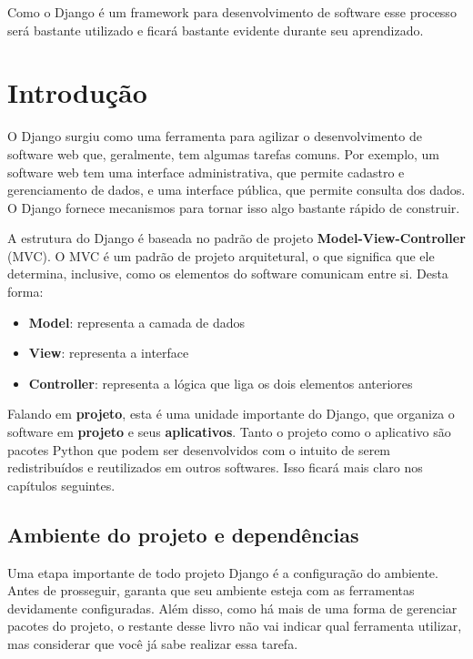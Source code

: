 \documentclass[brazil,a4paper,oneside,openright,parskip=full]{book}
\providecommand{\tightlist}{%
  \setlength{\itemsep}{0pt}\setlength{\parskip}{0pt}}
\begin{document}
Como o Django é um framework para desenvolvimento de software esse
processo será bastante utilizado e ficará bastante evidente durante seu
aprendizado.

\mainmatter

\hypertarget{sec:introducao}{%
\chapter{Introdução}\label{sec:introducao}}

O Django surgiu como uma ferramenta para agilizar o desenvolvimento de
software web que, geralmente, tem algumas tarefas comuns. Por exemplo,
um software web tem uma interface administrativa, que permite cadastro e
gerenciamento de dados, e uma interface pública, que permite consulta
dos dados. O Django fornece mecanismos para tornar isso algo bastante
rápido de construir.

A estrutura do Django é baseada no padrão de projeto
\textbf{Model-View-Controller} (MVC). O MVC é um padrão de projeto
arquitetural, o que significa que ele determina, inclusive, como os
elementos do software comunicam entre si. Desta forma:

\begin{itemize}
\tightlist
\item
  \textbf{Model}: representa a camada de dados
\item
  \textbf{View}: representa a interface
\item
  \textbf{Controller}: representa a lógica que liga os dois elementos
  anteriores
\end{itemize}

Falando em \textbf{projeto}, esta é uma unidade importante do Django,
que organiza o software em \textbf{projeto} e seus \textbf{aplicativos}.
Tanto o projeto como o aplicativo são pacotes Python que podem ser
desenvolvidos com o intuito de serem redistribuídos e reutilizados em
outros softwares. Isso ficará mais claro nos capítulos seguintes.

\hypertarget{ambiente-do-projeto-e-dependuxeancias}{%
\section{Ambiente do projeto e
dependências}\label{ambiente-do-projeto-e-dependuxeancias}}

Uma etapa importante de todo projeto Django é a configuração do
ambiente. Antes de prosseguir, garanta que seu ambiente esteja com as
ferramentas devidamente configuradas. Além disso, como há mais de uma
forma de gerenciar pacotes do projeto, o restante desse livro não vai
indicar qual ferramenta utilizar, mas considerar que você já sabe
realizar essa tarefa.
\end{document}
